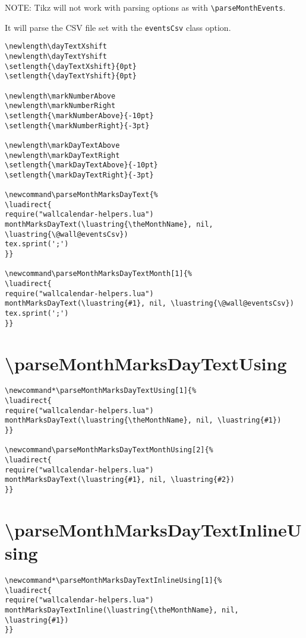\documentclass[11pt,oneside]{memoir-article}
\begin{document}
NOTE: Tikz will not work with parsing options as with \texttt{\textbackslash{}parseMonthEvents}.

It will parse the CSV file set with the \texttt{eventsCsv} class option.

\begin{verbatim}
\newlength\dayTextXshift
\newlength\dayTextYshift
\setlength{\dayTextXshift}{0pt}
\setlength{\dayTextYshift}{0pt}

\newlength\markNumberAbove
\newlength\markNumberRight
\setlength{\markNumberAbove}{-10pt}
\setlength{\markNumberRight}{-3pt}

\newlength\markDayTextAbove
\newlength\markDayTextRight
\setlength{\markDayTextAbove}{-10pt}
\setlength{\markDayTextRight}{-3pt}

\newcommand\parseMonthMarksDayText{%
\luadirect{
require("wallcalendar-helpers.lua")
monthMarksDayText(\luastring{\theMonthName}, nil, \luastring{\@wall@eventsCsv})
tex.sprint(';')
}}

\newcommand\parseMonthMarksDayTextMonth[1]{%
\luadirect{
require("wallcalendar-helpers.lua")
monthMarksDayText(\luastring{#1}, nil, \luastring{\@wall@eventsCsv})
tex.sprint(';')
}}
\end{verbatim}

\section{\textbackslash parseMonthMarksDayTextUsing}
\label{sec:org589ec47}

\begin{verbatim}
\newcommand*\parseMonthMarksDayTextUsing[1]{%
\luadirect{
require("wallcalendar-helpers.lua")
monthMarksDayText(\luastring{\theMonthName}, nil, \luastring{#1})
}}

\newcommand\parseMonthMarksDayTextMonthUsing[2]{%
\luadirect{
require("wallcalendar-helpers.lua")
monthMarksDayText(\luastring{#1}, nil, \luastring{#2})
}}
\end{verbatim}

\section{\textbackslash parseMonthMarksDayTextInlineUsing}
\label{sec:org34ae740}

\begin{verbatim}
\newcommand*\parseMonthMarksDayTextInlineUsing[1]{%
\luadirect{
require("wallcalendar-helpers.lua")
monthMarksDayTextInline(\luastring{\theMonthName}, nil, \luastring{#1})
}}
\end{verbatim}
\end{document}
